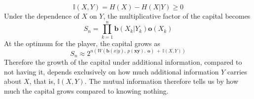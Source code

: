 \documentclass{article}
\begin{document}
\begin{equation}
    \mathbb{I}(X, Y) = H(X) - H(X|Y) \ge 0
\end{equation}
Under the dependence of $X$ on $Y$, the multiplicative factor of the capital becomes
\begin{equation}
    S_n = \prod_{k=1}^{n}\mathbf{b}(X_k|Y_k)\mathbf{o}(X_k)
\end{equation}
At the optimum for the player, the capital grows as 
\begin{equation}
    S_n \approx 2^{n(W(\mathbf{b}(x|y),\ p(\mathbf{xy}),\ \mathbf{o})\ +\ \mathbb{I}(X, Y))}
\end{equation}
Therefore the growth of the capital under additional information, compared to not having it, depends exclusively on how much additional information $Y$ carries about $X$, that is, $\mathbb{I}(X,Y)$. The mutual information therefore tells us by how much the capital grows compared to knowing nothing. 
\end{document}
